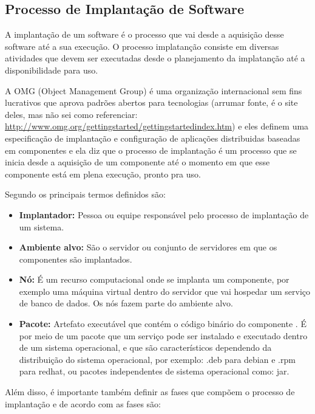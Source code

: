 \subsection{Processo de Implantação de Software}

A implantação de um software é o processo que vai desde a aquisição desse software
até a sua execução. \cite{leo2014} O processo implatanção consiste em diversas
atividades que devem ser executadas desde o planejamento da implatanção até a
disponibilidade para uso.

A OMG (Object Management Group) é uma organização internacional sem fins lucrativos
que aprova padrões abertos para tecnologias (arrumar fonte, é o site deles, mas
não sei como referenciar: \url{http://www.omg.org/gettingstarted/gettingstartedindex.htm})
e eles definem uma especificação de implantação e configuração de aplicações
distribuidas baseadas em componentes \cite{omg2006} e ela diz que o processo de
implantação é um processo que se inicia desde a aquisição de um componente até
o momento em que esse componente está em plena execução, pronto pra uso.

Segundo \cite{omg2006} os principais termos definidos são:

\begin{itemize}
  \item  \textbf{Implantador:} Pessoa ou equipe responsável pelo processo de
  implantação  de um sistema.
  \item  \textbf{Ambiente alvo:} São o servidor ou conjunto de servidores em
  que os componentes são implantados.
  \item  \textbf{Nó:} É um recurso computacional onde se implanta um componente,
  por exemplo uma máquina virtual dentro do servidor que vai hospedar um serviço
  de banco de dados. Os nós fazem parte do ambiente alvo.
  \item  \textbf{Pacote:} Artefato executável que contém o código binário do componente
  . É por meio de um pacote que um serviço pode ser instalado e executado dentro
  de um sistema operacional, e que são característicos dependendo da distribuição
  do sistema operacional, por exemplo: .deb para debian e .rpm para redhat, ou
  pacotes independentes de sistema operacional como: jar.
\end{itemize}

Além disso, é importante também definir as fases que compõem o processo de
implantação e de acordo com \cite{omg2006} as fases são:


